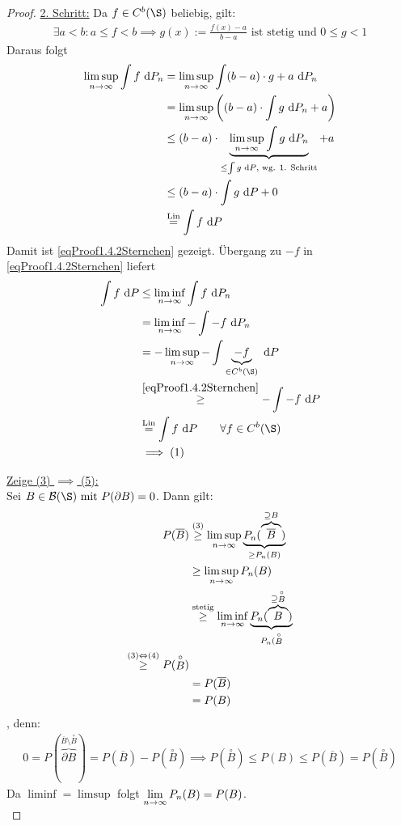 \begin{proof}
\ul{2. Schritt:} Da $f\in C^b(\S)$ beliebig, gilt:
\begin{align*}
\exists a<b:a\leq f<b
\implies g(x):=\frac{f(x)-a}{b-a}\text{ ist stetig und } 0\leq g<1
\end{align*}
Daraus folgt
\begin{align*}
\limsup\limits_{n\to\infty}\int\limits f\text{ d} P_n
&=\limsup\limits_{n\to\infty}\int\limits (b-a)\cdot g+a\text{ d} P_n\\
&=\limsup\limits_{n\to\infty}\left((b-a)\cdot\int\limits g\text{ d} P_n+a\right)\\
&\leq(b-a)\cdot\underbrace{\limsup\limits_{n\to\infty}\int\limits g\text{ d} P_n}_{\leq\int\limits g\text{ d} P\text{, wg. 1. Schritt}}+a\\
&\leq(b-a)\cdot\int\limits g\text{ d} P+0\\
&\stackrel{\text{Lin}}{=}
\int\limits f\text{ d} P
\end{align*}
Damit ist \eqref{eqProof1.4.2Sternchen} gezeigt. Übergang zu $-f$ in \eqref{eqProof1.4.2Sternchen} liefert
\begin{align*}
\int\limits f\d P
&\leq
\liminf\limits_{n\to\infty}\int\limits f\d P_n\\
&=\liminf\limits_{n\to\infty}-\int\limits -f\d P_n\\
&=-\limsup\limits_{n\to\infty}-\int\limits \underbrace{-f}_{\in C^b(\S)}\d P\\
&\stackrel{\eqref{eqProof1.4.2Sternchen}}{\geq}
-\int\limits -f\d P\\
&\stackeq{\text{Lin}}
\int\limits f\d P
\qquad\forall f\in C^b(\S)\\
&\implies(1)
\end{align*}

\underline{Zeige (3) $\implies$ (5):}\\
Sei $B\in\B(\S)\mit P(\partial B)=0$. Dann gilt:
\begin{align*}
P(\overline{B})
&\stackrel{(3)}{\geq}
\limsup\limits_{n\to\infty} \underbrace{P_n(\overbrace{\overline{B}}^{\supseteq B})}_{\geq P_n(B)}\\
&\geq\limsup\limits_{n\to\infty} P_n(B)\\
&\stackrel{\text{stetig}}{\geq}
\liminf\limits_{n\to\infty} \underbrace{P_n(\overbrace{B}^{\supseteq\stackrel{\circ}{B}})}_{P_n(\stackrel{\circ}{B}}\\
\stackrel{(3)\Leftrightarrow(4)}{\geq}
P(\stackrel{\circ}{B})\\
&=P(\overline{B})\\
&=P(B)
\end{align*}, denn:
\begin{align}\label{eqProof1.4.2SternchenZwei}
0
=P(\overbrace{\partial B}^{\overline{B}\setminus\stackrel{\circ}{B}}
)=P(\overline{B})-P(\stackrel{\circ}{B})
\implies
P(\stackrel{\circ}{B})\leq P(B)\leq P(\overline{B})=P(\stackrel{\circ}{B})
\end{align}
Da $\liminf=\limsup$ folgt $\lim\limits_{n\to\infty} P_n(B)=P(B)$.\\


\end{proof}

